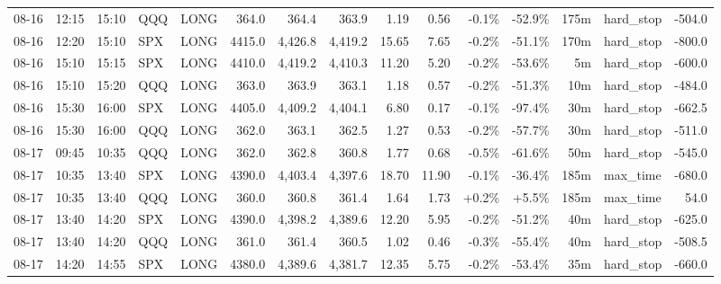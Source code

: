 \documentclass[11pt,a4paper,twoside]{article}
\begin{document}
\begin{landscape}
\begin{center}
\begin{longtable}{>{\color{txtmain}}l l l l l r r r r r r r r >{\color{txtmain}}l r}
08-16 & 12:15 & 15:10 & QQQ & LONG & 364.0 & 364.4 & 363.9 & 1.19 & 0.56 & \textcolor{lossred}{-0.1\%} & \textcolor{lossred}{-52.9\%} & 175m & hard\_stop & \textcolor{lossred}{-504.0} \\
08-16 & 12:20 & 15:10 & SPX & LONG & 4415.0 & 4,426.8 & 4,419.2 & 15.65 & 7.65 & \textcolor{lossred}{-0.2\%} & \textcolor{lossred}{-51.1\%} & 170m & hard\_stop & \textcolor{lossred}{-800.0} \\
08-16 & 15:10 & 15:15 & SPX & LONG & 4410.0 & 4,419.2 & 4,410.3 & 11.20 & 5.20 & \textcolor{lossred}{-0.2\%} & \textcolor{lossred}{-53.6\%} & 5m & hard\_stop & \textcolor{lossred}{-600.0} \\
08-16 & 15:10 & 15:20 & QQQ & LONG & 363.0 & 363.9 & 363.1 & 1.18 & 0.57 & \textcolor{lossred}{-0.2\%} & \textcolor{lossred}{-51.3\%} & 10m & hard\_stop & \textcolor{lossred}{-484.0} \\
08-16 & 15:30 & 16:00 & SPX & LONG & 4405.0 & 4,409.2 & 4,404.1 & 6.80 & 0.17 & \textcolor{lossred}{-0.1\%} & \textcolor{lossred}{-97.4\%} & 30m & hard\_stop & \textcolor{lossred}{-662.5} \\
08-16 & 15:30 & 16:00 & QQQ & LONG & 362.0 & 363.1 & 362.5 & 1.27 & 0.53 & \textcolor{lossred}{-0.2\%} & \textcolor{lossred}{-57.7\%} & 30m & hard\_stop & \textcolor{lossred}{-511.0} \\
08-17 & 09:45 & 10:35 & QQQ & LONG & 362.0 & 362.8 & 360.8 & 1.77 & 0.68 & \textcolor{lossred}{-0.5\%} & \textcolor{lossred}{-61.6\%} & 50m & hard\_stop & \textcolor{lossred}{-545.0} \\
08-17 & 10:35 & 13:40 & SPX & LONG & 4390.0 & 4,403.4 & 4,397.6 & 18.70 & 11.90 & \textcolor{lossred}{-0.1\%} & \textcolor{lossred}{-36.4\%} & 185m & max\_time & \textcolor{lossred}{-680.0} \\
08-17 & 10:35 & 13:40 & QQQ & LONG & 360.0 & 360.8 & 361.4 & 1.64 & 1.73 & \textcolor{wingreen}{+0.2\%} & \textcolor{wingreen}{+5.5\%} & 185m & max\_time & \textcolor{wingreen}{54.0} \\
08-17 & 13:40 & 14:20 & SPX & LONG & 4390.0 & 4,398.2 & 4,389.6 & 12.20 & 5.95 & \textcolor{lossred}{-0.2\%} & \textcolor{lossred}{-51.2\%} & 40m & hard\_stop & \textcolor{lossred}{-625.0} \\
08-17 & 13:40 & 14:20 & QQQ & LONG & 361.0 & 361.4 & 360.5 & 1.02 & 0.46 & \textcolor{lossred}{-0.3\%} & \textcolor{lossred}{-55.4\%} & 40m & hard\_stop & \textcolor{lossred}{-508.5} \\
08-17 & 14:20 & 14:55 & SPX & LONG & 4380.0 & 4,389.6 & 4,381.7 & 12.35 & 5.75 & \textcolor{lossred}{-0.2\%} & \textcolor{lossred}{-53.4\%} & 35m & hard\_stop & \textcolor{lossred}{-660.0} \\

\end{longtable}
\end{center}
\end{landscape}
\end{document}
